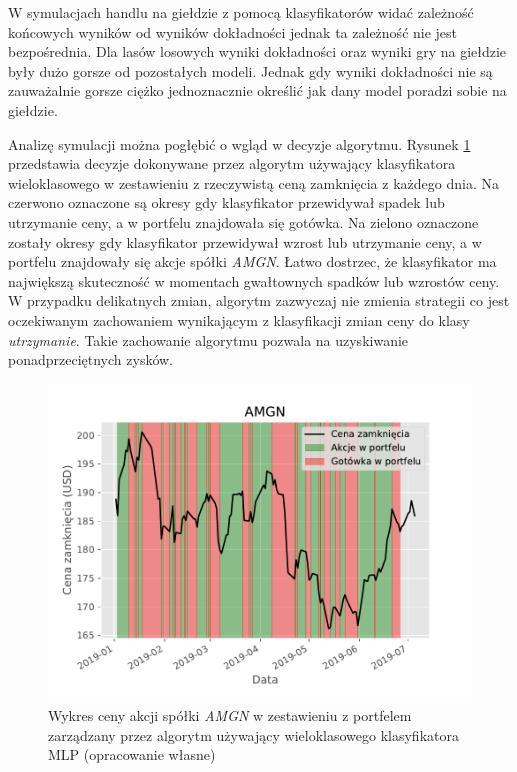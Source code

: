 \documentclass[a4paper, twoside, 11pt, openright]{article}
\begin{document}
W symulacjach handlu na giełdzie z pomocą klasyfikatorów widać zależność końcowych wyników od wyników dokładności jednak ta zależność nie jest bezpośrednia. Dla lasów losowych wyniki dokładności oraz wyniki gry na giełdzie były dużo gorsze od pozostałych modeli. Jednak gdy wyniki dokładności nie są zauważalnie gorsze ciężko jednoznacznie określić jak dany model poradzi sobie na giełdzie. 

\bigskip

Analizę symulacji można pogłębić o wgląd w decyzje algorytmu. Rysunek \ref{img:amgn_wallet_buy_sell} przedstawia decyzje dokonywane przez algorytm używający klasyfikatora wieloklasowego w zestawieniu z rzeczywistą ceną zamknięcia z każdego dnia. Na czerwono oznaczone są okresy gdy klasyfikator przewidywał spadek lub utrzymanie ceny, a w portfelu znajdowała się gotówka. Na zielono oznaczone zostały okresy gdy klasyfikator przewidywał wzrost lub utrzymanie ceny, a w portfelu znajdowały się akcje spółki \textit{AMGN}. Łatwo dostrzec, że klasyfikator ma największą skuteczność w momentach gwałtownych spadków lub wzrostów ceny. W przypadku delikatnych zmian, algorytm zazwyczaj nie zmienia strategii co jest oczekiwanym zachowaniem wynikającym z klasyfikacji zmian ceny do klasy \textit{utrzymanie}. Takie zachowanie algorytmu pozwala na uzyskiwanie ponadprzeciętnych zysków. 

\begin{figure}[H]
\centering \includegraphics[scale=1.1]{img/AMGN-buy_and_sell_plot.pdf}
\caption{Wykres ceny akcji spółki \textit{AMGN} w zestawieniu z portfelem zarządzany przez algorytm używający wieloklasowego klasyfikatora MLP (opracowanie własne)}
\label{img:amgn_wallet_buy_sell}
\end{figure}
\end{document}
